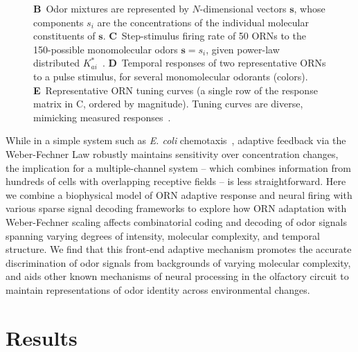 \documentclass[9pt,twocolumn,twoside]{pnas-new}
\begin{document}
\begin{figure}[!tb]
{{		\textbf{B}~Odor mixtures are represented by $N$-dimensional vectors $\mathbf s$, whose components $s_i$ are the concentrations of  the individual molecular constituents  of $\mathbf s$. 
		\textbf{C}~Step-stimulus firing rate of 50 ORNs to the 150-possible monomolecular odors $\mathbf s = s_i$, given  power-law distributed $K^*_{ai}$~\cite{si2017invariances}.
		\textbf{D}~Temporal responses of two representative ORNs to a pulse stimulus, for several monomolecular odorants (colors).
		\textbf{E}~Representative ORN tuning curves (a single row of the response matrix in C, ordered by magnitude). Tuning curves are diverse, mimicking measured responses~\cite{hallem_carlson}.
		}}
		\label{fig:tuning_curves}
\end{figure}

While in a simple system such as \textit{E. coli} chemotaxis~\cite{EmonetReview}, adaptive feedback via the Weber-Fechner Law robustly maintains sensitivity over concentration changes, the implication for a multiple-channel system -- which combines information from hundreds of cells with overlapping receptive fields  -- is less straightforward. Here we combine a biophysical model of ORN adaptive response and neural firing with various sparse signal decoding frameworks to explore how ORN adaptation with Weber-Fechner scaling affects combinatorial coding and decoding of odor signals spanning varying degrees of intensity, molecular complexity, and temporal structure. We find that this front-end adaptive mechanism promotes the accurate discrimination of odor signals from backgrounds of varying molecular complexity, and aids other known mechanisms of neural processing in the olfactory circuit to maintain representations of odor identity across environmental changes. %


\section*{Results}



\end{document}
